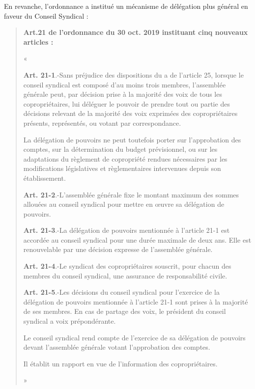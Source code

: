			En revanche, l’ordonnance a institué un mécanisme de délégation plus général en faveur du Conseil Syndical :
			\begin{quote}
				{\bfseries Art.21 de l’ordonnance du 30 oct. 2019 instituant cinq nouveaux articles :}
				
				« {\textbf{Art. 21-1}.-Sans préjudice des dispositions du a de l'article 25, lorsque le conseil syndical est composé d'au moins trois membres, l'assemblée générale peut, par décision prise à la majorité des voix de tous les copropriétaires, lui déléguer le pouvoir de prendre tout ou partie des décisions relevant de la majorité des voix exprimées des copropriétaires présents, représentés, ou votant par correspondance.
				
				La délégation de pouvoirs ne peut toutefois porter sur l'approbation des comptes, sur la détermination du budget prévisionnel, ou sur les adaptations du règlement de copropriété rendues nécessaires par les modifications législatives et règlementaires intervenues depuis son établissement.
				
				\textbf{Art. 21-2}.-L'assemblée générale fixe le montant maximum des sommes allouées au conseil syndical pour mettre en œuvre sa délégation de pouvoirs.
				
				\textbf{Art. 21-3}.-La délégation de pouvoirs mentionnée à l'article 21-1 est accordée au conseil syndical pour une durée maximale de deux ans. Elle est renouvelable par une décision expresse de l'assemblée générale.
				
				\textbf{Art. 21-4}.-Le syndicat des copropriétaires souscrit, pour chacun des membres du conseil syndical, une assurance de responsabilité civile.
				
				\textbf{Art. 21-5}.-Les décisions du conseil syndical pour l'exercice de la délégation de pouvoirs mentionnée à l'article 21-1 sont prises à la majorité de ses membres. En cas de partage des voix, le président du conseil syndical a voix prépondérante.
				
				Le conseil syndical rend compte de l'exercice de sa délégation de pouvoirs devant l'assemblée générale votant l'approbation des comptes.
				
				Il établit un rapport en vue de l'information des copropriétaires.} »
			\end{quote}
			
